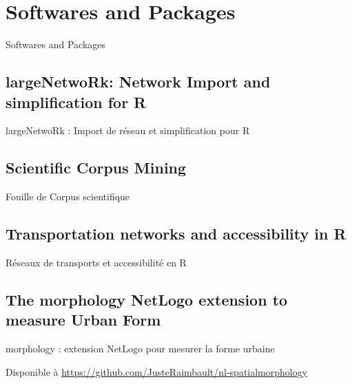
\newpage

\section{Softwares and Packages}{Softwares and Packages} %

\label{app:packages} %










\subsection{largeNetwoRk: Network Import and simplification for R}{largeNetwoRk : Import de réseau et simplification pour R}



\subsection{Scientific Corpus Mining}{Fouille de Corpus scientifique}






\subsection{Transportation networks and accessibility in R}{Réseaux de transports et accessibilité en R}







\subsection{The morphology NetLogo extension to measure Urban Form}{morphology : extension NetLogo pour mesurer la forme urbaine}

\label{app:subsec:morphologyextension}


Disponible à \url{https://github.com/JusteRaimbault/nl-spatialmorphology}













